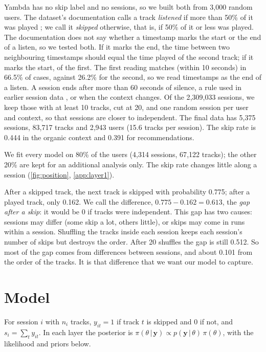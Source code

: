 \documentclass[12pt]{article}
\newcommand{\by}{\mathbf{y}}
\newcommand{\given}{\,\vert\,}
\begin{document}
Yambda has no skip label and no sessions, so we built both from 3{,}000 random users. The dataset's documentation calls a track \emph{listened} if more than 50\% of it was played \citep{yandex2025card}; we call it \emph{skipped} otherwise, that is, if 50\% of it or less was played. The documentation does not say whether a timestamp marks the start or the end of a listen, so we tested both. If it marks the end, the time between two neighbouring timestamps should equal the time played of the second track; if it marks the start, of the first. The first reading matches (within 10 seconds) in 66.5\% of cases, against 26.2\% for the second, so we read timestamps as the end of a listen. A session ends after more than 60 seconds of silence, a rule used in earlier session data \citep{brost2019music}, or when the context changes. Of the 2{,}309{,}033 sessions, we keep those with at least 10 tracks, cut at 20, and one random session per user and context, so that sessions are closer to independent. The final data has 5{,}375 sessions, 83{,}717 tracks and 2{,}943 users (15.6 tracks per session). The skip rate is 0.444 in the organic context and 0.391 for recommendations.

We fit every model on 80\% of the users (4{,}314 sessions, 67{,}122 tracks); the other 20\% are kept for an additional analysis only. The skip rate changes little along a session (\cref{fig:position}, \cref{app:layer1}).

After a skipped track, the next track is skipped with probability 0.775; after a played track, only 0.162. We call the difference, $0.775 - 0.162 = 0.613$, the \emph{gap after a skip}: it would be 0 if tracks were independent. This gap has two causes: sessions may differ (some skip a lot, others little), or skips may come in runs within a session. Shuffling the tracks inside each session keeps each session's number of skips but destroys the order. After 20 shuffles the gap is still 0.512. So most of the gap comes from differences between sessions, and about 0.101 from the order of the tracks. It is that difference that we want our model to capture.

\section{Model}\label{sec:model}

For session $i$ with $n_i$ tracks, $y_{it} = 1$ if track $t$ is skipped and $0$ if not, and $s_i = \sum_t y_{it}$. In each layer the posterior is $\pi(\theta \given \by) \propto p(\by \given \theta)\,\pi(\theta)$, with the likelihood and priors below.
\end{document}
